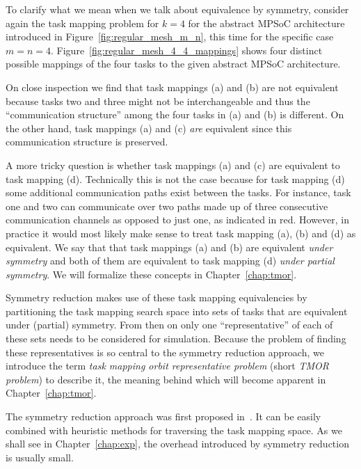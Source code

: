 To clarify what we mean when we talk about equivalence by symmetry, consider
again the task mapping problem for $k = 4$ for the abstract MPSoC architecture
introduced in Figure~\ref{fig:regular_mesh_m_n}, this time for the specific
case $m = n = 4$.  Figure~\ref{fig:regular_mesh_4_4_mappings} shows four
distinct possible mappings of the four tasks to the given abstract MPSoC
architecture.

On close inspection we find that task mappings (a) and (b) are not equivalent
because tasks two and three might not be interchangeable and thus the
``communication structure'' among the four tasks in (a) and (b) is different.
On the other hand, task mappings (a) and (c) \textit{are} equivalent since this
communication structure is preserved.

A more tricky question is whether task mappings (a) and (c) are equivalent to
task mapping (d). Technically this is not the case because for task
mapping (d) some additional communication paths exist between the tasks. For
instance, task one and two can communicate over two paths made up of three
consecutive communication channels as opposed to just one, as indicated in red.
However, in practice it would most likely make sense to treat task mapping (a),
(b) and (d) as equivalent. We say that that task mappings (a) and (b) are
equivalent \textit{under symmetry} and both of them are equivalent to task
mapping (d) \textit{under partial symmetry}. We will formalize these concepts
in Chapter~\ref{chap:tmor}.

Symmetry reduction makes use of these task mapping equivalencies by
partitioning the task mapping search space into sets of tasks that are
equivalent under (partial) symmetry. From then on only one ``representative''
of each of these sets needs to be considered for simulation. Because the
problem of finding these representatives is so central to the symmetry
reduction approach, we introduce the term \textit{task mapping orbit
representative problem} (short \textit{TMOR problem}) to describe it, the
meaning behind which will become apparent in Chapter~\ref{chap:tmor}.

The symmetry reduction approach was first proposed in~\cite{Goens}. It can be
easily combined with heuristic methods for traversing the task mapping space.
As we shall see in Chapter~\ref{chap:exp}, the overhead introduced by symmetry
reduction is usually small.
